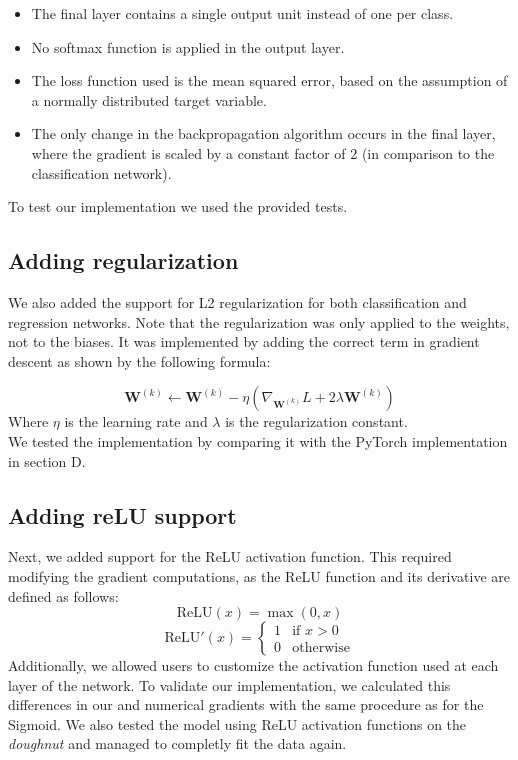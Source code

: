 \documentclass[9pt]{IEEEtran}
\begin{document}
\begin{itemize}
    \item The final layer contains a single output unit instead of one per class.
    \item No softmax function is applied in the output layer.
    \item The loss function used is the mean squared error, based on the assumption of a normally distributed target variable.
    \item The only change in the backpropagation algorithm occurs in the final layer, where the gradient is scaled by a constant factor of 2 (in comparison to the classification network).
\end{itemize}

To test our implementation we used the provided tests.

\subsection{Adding regularization}
We also added the support for L2 regularization for both classification and regression networks. 
Note that the regularization was only applied to the weights, not to the biases.
It was implemented by adding the correct term in gradient descent
  as shown by the following formula:

\[
\mathbf{W}^{(k)} \leftarrow \mathbf{W}^{(k)} - \eta \left( \nabla_{\mathbf{W}^{(k)}} L + 2\lambda \mathbf{W}^{(k)} \right)
\]
Where $\eta$ is the learning rate and $\lambda$ is the regularization constant.\\
We tested the implementation by comparing it with the PyTorch implementation in section D.

\subsection{Adding reLU support}
Next, we added support for the ReLU activation function. This required modifying the gradient computations, as the ReLU function and its derivative are defined as follows:
\[
\text{ReLU}(x) = \max(0, x)
\]
\[
\text{ReLU}'(x) =
\begin{cases}
1 & \text{if } x > 0 \\
0 & \text{otherwise}
\end{cases}
\]
Additionally, we allowed users to customize the activation function used at each layer
 of the network. To validate our implementation, we calculated this differences in our and 
 numerical gradients with the same procedure as for the Sigmoid. We also tested the model using ReLU activation
  functions on the \textit{doughnut} and managed to completly fit the data again.
\end{document}
